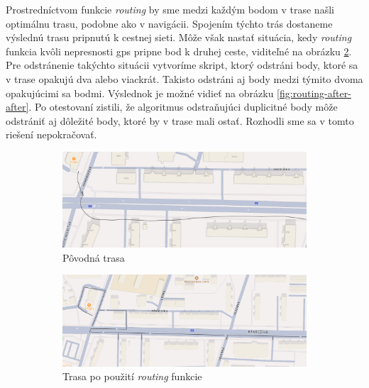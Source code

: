 Prostredníctvom funkcie \textit{routing} by sme medzi každým bodom v trase našli optimálnu trasu, podobne ako v navigácii. Spojením týchto trás dostaneme výslednú trasu pripnutú k cestnej sieti. Môže však nastať situácia, kedy \textit{routing} funkcia kvôli nepresnosti \acrshort{gps} pripne bod k druhej ceste, viditeľné na obrázku \ref{fig:routing-after}. Pre odstránenie takýchto situácii vytvoríme skript, ktorý odstráni body, ktoré sa v trase opakujú dva alebo viackrát. Takisto odstráni aj body medzi týmito dvoma opakujúcimi sa bodmi. Výslednok je možné vidieť na obrázku \ref{fig:routing-after-after}. Po otestovaní zistili, že algoritmus odstraňujúci duplicitné body môže odstrániť aj dôležité body, ktoré by v trase mali ostať. Rozhodli sme sa v tomto riešení nepokračovať.

\begin{figure}
    \centering
    \begin{subfigure}{0.9\textwidth}
        \centering
        \includegraphics[width=\textwidth]{img/routing/pred.png}
        \caption{Pôvodná trasa}
        \label{fig:routing-original}
    \end{subfigure}
    \begin{subfigure}{0.9\textwidth}
        \centering
        \includegraphics[width=\textwidth]{img/routing/po.png}
        \caption{Trasa po použití \textit{routing} funkcie}
        \label{fig:routing-after}
    \end{subfigure}
    \begin{subfigure}{0.9\textwidth}

\end{subfigure}
\end{figure}
